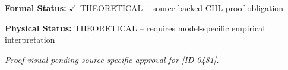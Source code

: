 \textbf{Formal Status:} \ensuremath{\checkmark}\ THEORETICAL -- source-backed CHL proof obligation

\textbf{Physical Status:} THEORETICAL -- requires model-specific empirical interpretation
\par\vspace{0.45em}
\par
\vfill
\begingroup\footnotesize\itshape
Proof visual pending source-specific approval for [ID 0481].
\par\endgroup
\vfill
\endgroup
\endgroup
